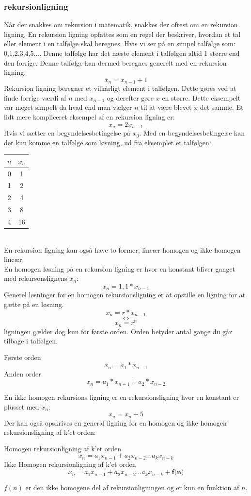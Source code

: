 \documentclass[12pt]{article}
\begin{document}
\subsubsection{rekursionligning}
Når der snakkes om rekursion i matematik, snakkes der oftest om en rekursion ligning. 
En rekursion ligning opfattes som en regel der beskriver, hvordan et tal eller element i en talfølge skal beregnes. Hvis vi ser på en simpel talfølge som: {0,1,2,3,4,5...}. Denne talfølge har det næste element i talfølgen altid 1 større end den forrige. Denne talfølge kan dermed beregnes generelt med en rekursion ligning. 
\[x_n = x_{n-1} + 1\] 
Rekursion ligning beregner et vilkårligt element i talfølgen. Dette gøres ved at finde forrige værdi af $n$ med $x_{n-1}$ og derefter gøre $x$ en større. 
Dette eksempelt var meget simpelt da hvad end man vælger $n$ til at være blevet $x$ det samme. 
Et lidt mere kompliceret eksempel af en rekursion ligning er:
\[x_n = 2x_{n-1}\] 
Hvis vi sætter en begyndelsesbetingelse på $x_{0}$.
Med en begyndelsesbetingelse kan der kun komme en talfølge som løsning, 
ud fra eksemplet er talfølgen:
\begin{table}[ht]
  \centering
  \begin{tabular}{ |c|c| }
   \hline
   \textbf{$n$} & \textbf{$x_{n}$}  \\ 
   \hline
   0 & 1  \\
   \hline
   1 & 2 \\ 
   \hline
   2 & 4 \\ 
   \hline
   3 & 8  \\ 
   \hline
   4 & 16  \\ 
   \hline
  \end{tabular}
\end{table}\\
En rekursion ligning kan også have to former, lineær homogen og ikke homogen lineær.\\  
En homogen løsning på en rekursion ligning er hvor en konstant bliver ganget med rekursonslignens $x_{n}$:
\[x_{n}=1,1*x_{n-1}\]
Generel løsninger for en homogen rekursionsligning er at opstille en ligning for at gætte på en løsning.\\ 
\[x_{n}=r*x_{n-1}\]
\[\Longleftrightarrow \]
\[x_{n}=r^n\]
ligningen gælder dog kun for første orden. Orden betyder antal gange du går tilbage i talfølgen.
\begin{center}  
  Første orden \[x_{n}=a_{1}*x_{n-1}\]
  Anden order \[x_{n}=a_{1}*x_{n-1} +a_{2}*x_{n-2}\]
\end{center}
En ikke homogen rekursions ligning er en rekursionsligning hvor en konstant er plusset med $x_{n}$:
\[x_{n}=x_{n}+5\]
Der kan også opskrives en general ligning for en homogen og ikke homogen rekursionsligning af k'et orden:
\begin{center}  
  Homogen rekursionligning af k'et orden \[x_{n}=a_{1}x_{n-1}+a_{2}x_{n-2}\dots a_{k}x_{n-k}\]
  Ikke Homogen rekursionligning af k'et orden \[x_{n}=a_{1}x_{n-1}+a_{2}x_{n-2}\dots a_{k}x_{n-k} + \textbf{f(n)}\]
\end{center}
$f(n)$ er den ikke homogene del af rekursionligningen og er kun en funktion af $n$.
\end{document}
